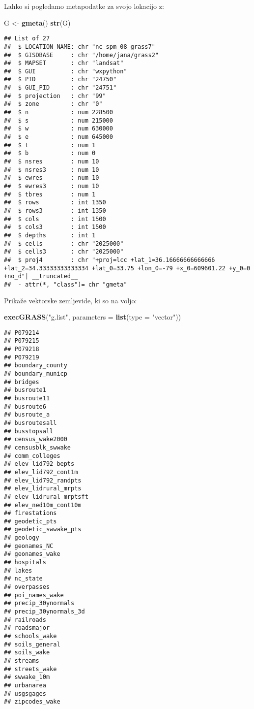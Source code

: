 \documentclass[]{article}
\newenvironment{Shaded}{\begin{snugshade}}{\end{snugshade}}
\newcommand{\KeywordTok}[1]{\textcolor[rgb]{0.13,0.29,0.53}{\textbf{#1}}}
\newcommand{\DataTypeTok}[1]{\textcolor[rgb]{0.13,0.29,0.53}{#1}}
\newcommand{\StringTok}[1]{\textcolor[rgb]{0.31,0.60,0.02}{#1}}
\newcommand{\NormalTok}[1]{#1}
\begin{document}
Lahko si pogledamo metapodatke za svojo lokacijo z:

\begin{Shaded}
\begin{Highlighting}[]
\NormalTok{G <-}\StringTok{ }\KeywordTok{gmeta}\NormalTok{()}
\KeywordTok{str}\NormalTok{(G)}
\end{Highlighting}
\end{Shaded}

\begin{verbatim}
## List of 27
##  $ LOCATION_NAME: chr "nc_spm_08_grass7"
##  $ GISDBASE     : chr "/home/jana/grass2"
##  $ MAPSET       : chr "landsat"
##  $ GUI          : chr "wxpython"
##  $ PID          : chr "24750"
##  $ GUI_PID      : chr "24751"
##  $ projection   : chr "99"
##  $ zone         : chr "0"
##  $ n            : num 228500
##  $ s            : num 215000
##  $ w            : num 630000
##  $ e            : num 645000
##  $ t            : num 1
##  $ b            : num 0
##  $ nsres        : num 10
##  $ nsres3       : num 10
##  $ ewres        : num 10
##  $ ewres3       : num 10
##  $ tbres        : num 1
##  $ rows         : int 1350
##  $ rows3        : int 1350
##  $ cols         : int 1500
##  $ cols3        : int 1500
##  $ depths       : int 1
##  $ cells        : chr "2025000"
##  $ cells3       : chr "2025000"
##  $ proj4        : chr "+proj=lcc +lat_1=36.16666666666666 +lat_2=34.33333333333334 +lat_0=33.75 +lon_0=-79 +x_0=609601.22 +y_0=0 +no_d"| __truncated__
##  - attr(*, "class")= chr "gmeta"
\end{verbatim}

Prikaže vektorske zemljevide, ki so na voljo:

\begin{Shaded}
\begin{Highlighting}[]
\KeywordTok{execGRASS}\NormalTok{(}\StringTok{"g.list"}\NormalTok{, }\DataTypeTok{parameters =} \KeywordTok{list}\NormalTok{(}\DataTypeTok{type =} \StringTok{"vector"}\NormalTok{))}
\end{Highlighting}
\end{Shaded}

\begin{verbatim}
## P079214
## P079215
## P079218
## P079219
## boundary_county
## boundary_municp
## bridges
## busroute1
## busroute11
## busroute6
## busroute_a
## busroutesall
## busstopsall
## census_wake2000
## censusblk_swwake
## comm_colleges
## elev_lid792_bepts
## elev_lid792_cont1m
## elev_lid792_randpts
## elev_lidrural_mrpts
## elev_lidrural_mrptsft
## elev_ned10m_cont10m
## firestations
## geodetic_pts
## geodetic_swwake_pts
## geology
## geonames_NC
## geonames_wake
## hospitals
## lakes
## nc_state
## overpasses
## poi_names_wake
## precip_30ynormals
## precip_30ynormals_3d
## railroads
## roadsmajor
## schools_wake
## soils_general
## soils_wake
## streams
## streets_wake
## swwake_10m
## urbanarea
## usgsgages
## zipcodes_wake
\end{verbatim}
\end{document}
